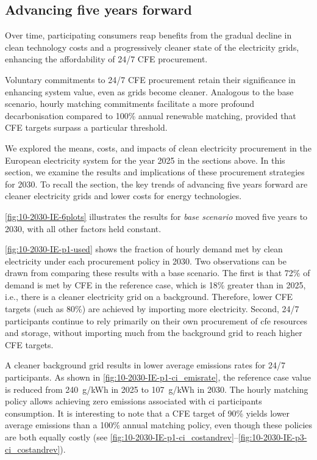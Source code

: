 \subsection{Advancing five years forward}
\label{subsec:time}

\begin{res}
    Over time, participating consumers reap benefits from the gradual decline in clean technology costs and a progressively cleaner state of the electricity grids, enhancing the affordability of 24/7 CFE procurement.
\end{res}

\begin{res}
    Voluntary commitments to 24/7 CFE procurement retain their significance in enhancing system value, even as grids become cleaner. Analogous to the base scenario, hourly matching commitments facilitate a more profound decarbonisation compared to 100\% annual renewable matching, provided that CFE targets surpass a particular threshold.
\end{res}

We explored the means, costs, and impacts of clean electricity procurement in the European electricity system for the year 2025 in the sections above.
In this section, we examine the results and implications of these procurement strategies for 2030.
To recall the  section, the key trends of advancing five years forward are cleaner electricity grids and lower costs for energy technologies.

\cref{fig:10-2030-IE-6plots} illustrates the results for \textit{base scenario} moved five years to 2030, with all other factors held constant. 

\cref{fig:10-2030-IE-p1-used} shows the fraction of hourly demand met by clean electricity under each procurement policy in 2030.
Two observations can be drawn from comparing these results with a base scenario.
The first is that 72\% of demand is met by CFE in the reference case, which is 18\% greater than in 2025, i.e., there is a cleaner electricity grid on a background.
Therefore, lower CFE targets (such as 80\%) are achieved by importing more electricity.
Second, 24/7 participants continue to rely primarily on their own procurement of \gls{cfe} resources and storage, without importing much from the background grid to reach higher CFE targets.

A cleaner background grid results in lower average emissions rates for 24/7 participants. 
As shown in \cref{fig:10-2030-IE-p1-ci_emisrate}, the reference case value is reduced from 240~g\co/kWh in 2025 to 107~g\co/kWh in 2030.
The hourly matching policy allows achieving zero emissions associated with \gls{ci} participants consumption.
It is interesting to note that a CFE target of 90\% yields lower average emissions than a 100\% annual matching policy, even though these policies are both equally costly (see \cref{fig:10-2030-IE-p1-ci_costandrev}--\cref{fig:10-2030-IE-p3-ci_costandrev}).


